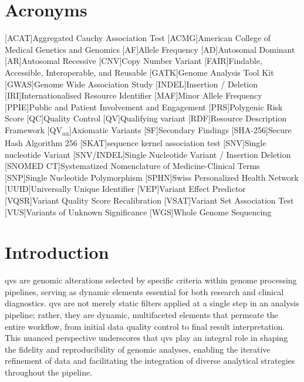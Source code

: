 \section*{Acronyms}
\renewenvironment{description}
{\list{}{\labelwidth0pt\itemindent-\leftmargin
    \parsep-1em\itemsep0pt\let\makelabel\descriptionlabel}}
               {\endlist}
\begin{acronym} 
 [ACAT]{Aggregated Cauchy Association Test }
 [ACMG]{American College of Medical Genetics and Genomics}
 [AF]{Allele Frequency}
 [AD]{Autosomal Dominant}
 [AR]{Autosomal Recessive}
  [CNV]{Copy Number Variant}
 [FAIR]{Findable, Accessible, Interoperable, and Reusable}
 [GATK]{Genome Analysis Tool Kit}
 [GWAS]{Genome Wide Association Study}
 [INDEL]{Insertion / Deletion}
 [IRI]{Internationalised Resource Identifier}
 [MAF]{Minor Allele Frequency}
 [PPIE]{Public and Patient Involvement and Engagement}
 [PRS]{Polygenic Risk Score} 
 [QC]{Quality Control}
 [QV]{Qualifying variant}
 [RDF]{Resource Description Framework}
 [QV\textsubscript{ax}]{Axiomatic Variants}
 [SF]{Secondary Findings}
 [SHA-256]{Secure Hash Algorithm 256}
 [SKAT]{sequence kernel association test} 
 [SNV]{Single nucleotide Variant}
  [SNV/INDEL]{Single Nucleotide Variant / Insertion Deletion}
  [SNOMED CT]{Systematized Nomenclature of Medicine-Clinical Terms}
 [SNP]{Single Nucleotide Polymorphism}
 [SPHN]{Swiss Personalized Health Network}
 [UUID]{Universally Unique Identifier}
  [VEP]{Variant Effect Predictor}
 [VQSR]{Variant Quality Score Recalibration}
 [VSAT]{Variant Set Association Test}
 [VUS]{Variants of Unknown Significance}
 [WGS]{Whole Genome Sequencing}
\end{acronym}

\clearpage

\section{Introduction}
\label{sec:intro}

\ac{qv}s are genomic alterations selected by specific criteria within genome processing pipelines, serving as dynamic elements essential for both research and clinical diagnostics. 
\ac{qv}s are not merely static filters applied at a single step in an analysis pipeline; rather, they are dynamic, multifaceted elements that permeate the entire workflow, from initial data quality control to final result interpretation. This nuanced perspective underscores that \ac{qv}s play an integral role in shaping the fidelity and reproducibility of genomic analyses, enabling the iterative refinement of data and facilitating the integration of diverse analytical strategies throughout the pipeline.


